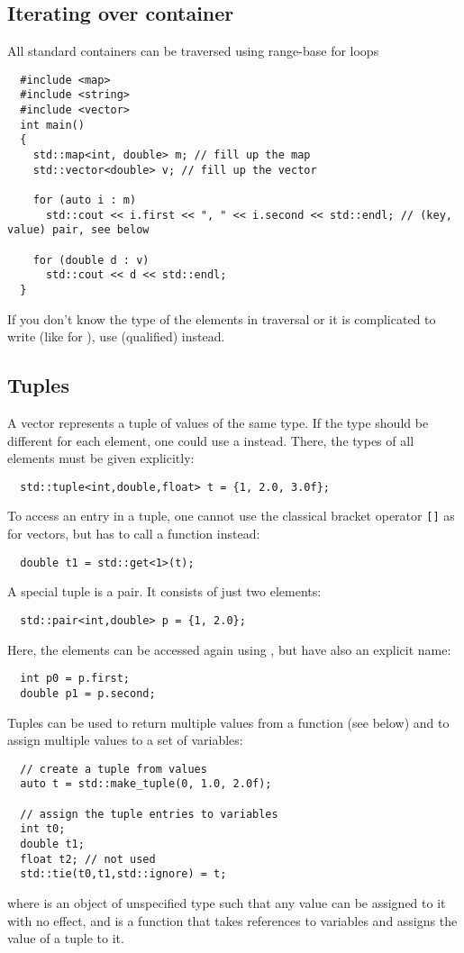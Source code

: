 \subsection{Iterating over container}
All standard containers can be traversed using range-base for loops
\begin{verbatim}
  #include <map>
  #include <string>
  #include <vector>
  int main()
  {
    std::map<int, double> m; // fill up the map
    std::vector<double> v; // fill up the vector

    for (auto i : m)
      std::cout << i.first << ", " << i.second << std::endl; // (key, value) pair, see below

    for (double d : v)
      std::cout << d << std::endl;
  }
\end{verbatim}
If you don't know the type of the elements in traversal or it is complicated to write (like for ), use (qualified)  instead.

\subsection{Tuples}
A vector represents a tuple of values of the same type. If the type should be
different for each element, one could use a  instead. There, the types of all elements must be given
explicitly:
%
\begin{verbatim}
  std::tuple<int,double,float> t = {1, 2.0, 3.0f};
\end{verbatim}
%
To access an entry in a tuple, one cannot use the classical bracket operator \texttt{[]} as for vectors, but has to call a
function instead:
%
\begin{verbatim}
  double t1 = std::get<1>(t);
\end{verbatim}

A special tuple is a pair. It consists of just two elements:
%
\begin{verbatim}
  std::pair<int,double> p = {1, 2.0};
\end{verbatim}
%
Here, the elements can be accessed again using , but have also an explicit name:
%
\begin{verbatim}
  int p0 = p.first;
  double p1 = p.second;
\end{verbatim}

Tuples can be used to return multiple values from a function (see below) and to assign multiple values to a set of
variables:
%
\begin{verbatim}
  // create a tuple from values
  auto t = std::make_tuple(0, 1.0, 2.0f);

  // assign the tuple entries to variables
  int t0;
  double t1;
  float t2; // not used
  std::tie(t0,t1,std::ignore) = t;
\end{verbatim}
%
where  is an object of unspecified type such that any value can be assigned to it with no effect, and
 is a function that takes references to variables and assigns the value of a tuple to it.


